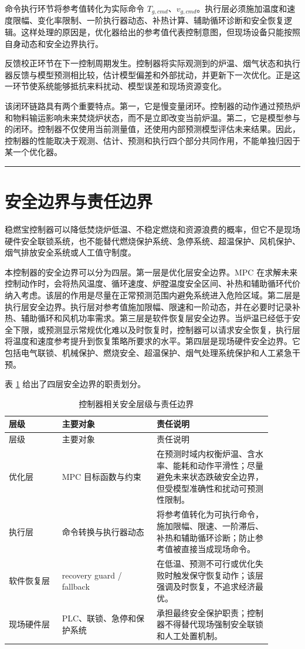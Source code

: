 \documentclass[UTF8,openany,zihao=-4,oneside]{ctexbook}
\newcommand{\manualdivider}{\par\vspace{0.6em}\noindent\textcolor{FGLine}{\rule{\linewidth}{0.7pt}}\vspace{0.6em}\par}
\begin{document}
命令执行环节将参考值转化为实际命令 \(T_{g,cmd}\)、\(v_{g,cmd}\)。执行层必须施加温度和速度限幅、变化率限制、一阶执行器动态、补热计算、辅助循环诊断和安全恢复逻辑。这样处理的原因是，优化器给出的参考值代表控制意图，但现场设备只能按照自身动态和安全边界执行。

反馈校正环节在下一控制周期发生。控制器将实际观测到的炉温、烟气状态和执行器反馈与模型预测相比较，估计模型偏差和外部扰动，并更新下一次优化。正是这一环节使系统能够抵抗来料扰动、模型误差和现场资源变化。

该闭环链路具有两个重要特点。第一，它是慢变量闭环。控制器的动作通过预热炉和物料输运影响未来焚烧炉状态，而不是立即改变当前炉温。第二，它是模型参与的闭环。控制器不仅使用当前测量值，还使用内部预测模型评估未来结果。因此，控制器的性能取决于观测、估计、预测和执行四个部分共同作用，不能单独归因于某一个优化器。

\manualdivider

\section{安全边界与责任边界}\label{sec:safety-boundary}

稳燃宝控制器可以降低焚烧炉低温、不稳定燃烧和资源浪费的概率，但它不是现场硬件安全联锁系统，也不能替代燃烧保护系统、急停系统、超温保护、风机保护、烟气排放安全系统或人工值守制度。

本控制器的安全边界可以分为四层。第一层是优化层安全边界。MPC 在求解未来控制动作时，会将热风温度、循环速度、炉膛温度安全区间、补热和辅助循环代价纳入考虑。该层的作用是尽量在正常预测范围内避免系统进入危险区域。第二层是执行层安全边界。执行层对参考值施加限幅、限速和一阶动态，并在必要时记录补热、辅助循环和风机功率需求。第三层是软件恢复层安全边界。当炉温已经低于安全下限，或预测显示常规优化难以及时恢复时，控制器可以请求安全恢复，执行层将温度和速度参考提升到恢复策略所要求的水平。第四层是现场硬件安全边界。它包括电气联锁、机械保护、燃烧安全、超温保护、烟气处理系统保护和人工紧急干预。

表 \ref{tab:safety-layer} 给出了四层安全边界的职责划分。

\begin{longtable}{@{}p{0.18\linewidth}p{0.32\linewidth}p{0.39\linewidth}@{}}
\caption{控制器相关安全层级与责任边界}\label{tab:safety-layer}\\
\toprule
层级 & 主要对象 & 责任说明 \\
\midrule
\endfirsthead
\toprule
层级 & 主要对象 & 责任说明 \\
\midrule
\endhead
优化层 & MPC 目标函数与约束 & 在预测时域内权衡炉温、含水率、能耗和动作平滑性；尽量避免未来状态跌破安全边界，但受模型准确性和扰动可预测性限制。 \\
执行层 & 命令转换与执行器动态 & 将参考值转化为可执行命令，施加限幅、限速、一阶滞后、补热和辅助循环诊断；防止参考值被直接当成现场命令。 \\
软件恢复层 & recovery guard / fallback & 在低温、预测不可行或优化失败时触发保守恢复动作；该层强调及时恢复，不追求经济最优。 \\
现场硬件层 & PLC、联锁、急停和保护系统 & 承担最终安全保护职责；控制器不得替代现场强制安全联锁和人工处置机制。 \\
\bottomrule
\end{longtable}
\end{document}
